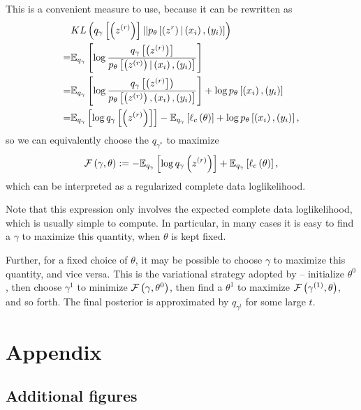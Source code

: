 \documentclass[14pt]{extarticle}
\begin{document}
This is a convenient measure to use, because it can be rewritten as
\begin{align*}
&KL\left(q_{\gamma}\left[\left(z^{(r)}\right)\right] \vert \vert
p_{\theta}\left[\left(z^{r}\right) \vert \left(x_{i}\right), \left(y_{i}\right)\right]\right) \\
= &\mathbb{E}_{q_{\gamma}}\left[{\log\frac{q_{\gamma}\left[\left(z^{(r)}\right)\right]}{p_{\theta}\left[\left(z^{(r)}\right) \vert \left(x_{i}\right), \left(y_{i}\right)\right]}}\right] \\
= &\mathbb{E}_{q_{\gamma}}\left[{\log\frac{q_{\gamma}\left[\left(z^{(r)}\right]\right)}{p_{\theta}\left[\left(z^{(r)}\right), \left(x_{i}\right), \left(y_{i}\right)\right]}}\right] + \log p_{\theta}\left[\left(x_{i}\right), \left(y_{i}\right)\right] \\
= &\mathbb{E}_{q_{\gamma}}\left[{\log q_{\gamma}\left[\left(z^{(r)}\right)\right]}\right] - \mathbb{E}_{q_{\gamma}}\left[{\ell_{c}\left(\theta\right)}\right] + \log p_{\theta}\left[\left(x_{i}\right), \left(y_{i}\right)\right],
\end{align*}
so we can equivalently choose the $q_{\gamma^{\ast}}$ to maximize
\begin{align*}
\mathcal{F}\left(\gamma, \theta\right) := -\mathbb{E}_{q_{\gamma}}\left[{\log q_{\gamma}\left(z^{(r)}\right)}\right] + \mathbb{E}_{q_{\gamma}}\left[{\ell_{c}\left(\theta\right)}\right],
\end{align*}
which can be interpreted as a regularized complete data loglikelihood.

Note that this expression only involves the expected complete data
loglikelihood, which is usually simple to compute. In particular, in many cases
it is easy to find a $\gamma$ to maximize this quantity, when $\theta$ is kept
fixed.

Further, for a fixed choice of $\theta$, it may be possible to choose $\gamma$
to maximize this quantity, and vice versa. This is the variational  strategy
adopted by \citep{zhang2005learning} -- initialize $\theta^{0}$, then choose
$\gamma^{1}$ to minimize $\mathcal{F}\left(\gamma, \theta^{0}\right)$, then
find a $\theta^{1}$ to maximize $\mathcal{F}\left(\gamma^{(1)}, \theta\right)$, and
so forth. The final posterior is approximated by $q_{\gamma^{t}}$ for some
large $t$.




\section{Appendix}

\subsection{Additional figures}
\end{document}
